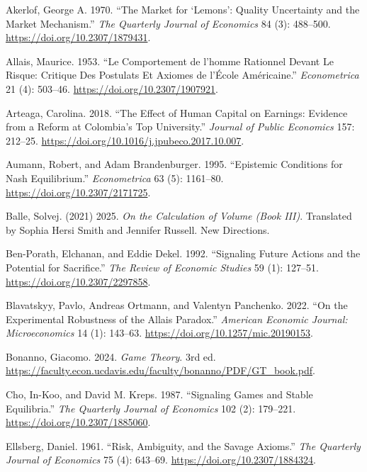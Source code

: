 \documentclass[
  11pt,
  letterpaper,
]{scrbook}
\newlength{\cslhangindent}
\newenvironment{CSLReferences}[2] %
 {\begin{list}{}{%
  \setlength{\itemindent}{0pt}
  \setlength{\leftmargin}{0pt}
  \setlength{\parsep}{0pt}
  \ifodd #1
   \setlength{\leftmargin}{\cslhangindent}
   \setlength{\itemindent}{-1\cslhangindent}
  \fi
  \setlength{\itemsep}{#2\baselineskip}}}
 {\end{list}}
\begin{document}
\protect{}\label{refs}
\begin{CSLReferences}{1}{1}
Akerlof, George A. 1970. {``The Market for {`Lemons'}: Quality
Uncertainty and the Market Mechanism.''} \emph{The Quarterly Journal of
Economics} 84 (3): 488--500. \url{https://doi.org/10.2307/1879431}.

Allais, Maurice. 1953. {``Le Comportement de l'homme Rationnel Devant Le
Risque: Critique Des Postulats Et Axiomes de l'{É}cole Am{é}ricaine.''}
\emph{Econometrica} 21 (4): 503--46.
\url{https://doi.org/10.2307/1907921}.

Arteaga, Carolina. 2018. {``The Effect of Human Capital on Earnings:
Evidence from a Reform at {C}olombia's Top University.''} \emph{Journal
of Public Economics} 157: 212--25.
\url{https://doi.org/10.1016/j.jpubeco.2017.10.007}.

Aumann, Robert, and Adam Brandenburger. 1995. {``Epistemic Conditions
for Nash Equilibrium.''} \emph{Econometrica} 63 (5): 1161--80.
\url{https://doi.org/10.2307/2171725}.

Balle, Solvej. (2021) 2025. \emph{On the Calculation of Volume (Book
{III})}. Translated by Sophia Hersi Smith and Jennifer Russell. New
Directions.

Ben-Porath, Elchanan, and Eddie Dekel. 1992. {``Signaling Future Actions
and the Potential for Sacrifice.''} \emph{The Review of Economic
Studies} 59 (1): 127--51. \url{https://doi.org/10.2307/2297858}.

Blavatskyy, Pavlo, Andreas Ortmann, and Valentyn Panchenko. 2022. {``On
the Experimental Robustness of the Allais Paradox.''} \emph{American
Economic Journal: Microeconomics} 14 (1): 143--63.
\url{https://doi.org/10.1257/mic.20190153}.

Bonanno, Giacomo. 2024. \emph{Game Theory}. 3rd ed.
\url{https://faculty.econ.ucdavis.edu/faculty/bonanno/PDF/GT_book.pdf}.

Cho, In-Koo, and David M. Kreps. 1987. {``Signaling Games and Stable
Equilibria.''} \emph{The Quarterly Journal of Economics} 102 (2):
179--221. \url{https://doi.org/10.2307/1885060}.

Ellsberg, Daniel. 1961. {``Risk, Ambiguity, and the Savage Axioms.''}
\emph{The Quarterly Journal of Economics} 75 (4): 643--69.
\url{https://doi.org/10.2307/1884324}.


\end{CSLReferences}
\end{document}
